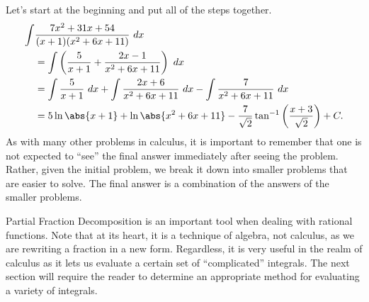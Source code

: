 {Let's start at the beginning and put all of the steps together.
\begin{align*}
	\int&\frac{7x^2+31x+54}{(x+1)(x^2+6x+11)}\ dx \\
	&= \int\left(\frac{5}{x+1} + \frac{2x-1}{x^2+6x+11}\right)\ dx \\
	&= \int\frac{5}{x+1}\ dx  + \int\frac{2x+6}{x^2+6x+11}\ dx -\int\frac{7}{x^2+6x+11}\ dx \\
	&= 5\ln\abs{x+1}+\ln\abs{x^2+6x+11}-\frac7{\sqrt2}\tan^{-1}\left(\frac{x+3}{\sqrt2}\right)+C.
\end{align*}
As with many other problems in calculus, it is important to remember that one is not expected to ``see'' the final answer immediately after seeing the problem. Rather, given the initial problem, we break it down into smaller problems that are easier to solve. The final answer is a combination of the answers of the smaller problems.}

Partial Fraction Decomposition is an important tool when dealing with rational functions. Note that at its heart, it is a technique of algebra, not calculus, as we are rewriting a fraction in a new form. Regardless, it is very useful in the realm of calculus as it lets us evaluate a certain set of ``complicated'' integrals.  The next section will require the reader to determine an appropriate method for evaluating a variety of integrals.

